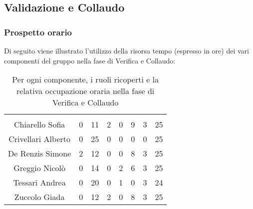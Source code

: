 \subsection{Validazione e Collaudo}

\subsubsection{Prospetto orario}
Di seguito viene illustrato l'utilizzo della risorsa tempo (espresso in ore) dei vari componenti del gruppo nella fase di Verifica e Collaudo:

\begin{table}[H]
	\begin{center}
		\begin{tabular}{c
				!{\color[HTML]{9b240a}\vrule width 1pt}
				cccccc
				!{\color[HTML]{9b240a}\vrule width 1pt}	
				c}
			\rowcolorhead
			 &  &  &  &  &  &  &  \\
			
			Chiarello Sofia & 0 & 11 & 2 & 0 & 9 & 3 & 25\\
			Crivellari Alberto & 0 & 25 & 0 & 0 & 0 & 0 & 25\\
			De Renzis Simone & 2 & 12 & 0 & 0 & 8 & 3 & 25\\
			Greggio Nicolò & 0 & 14 & 0 & 2 & 6 & 3 & 25\\
			Tessari Andrea & 0 & 20 & 0 & 1 & 0 & 3 & 24\\
			Zuccolo Giada & 0 & 12 & 2 & 0 & 8 & 3 & 25\\
		\end{tabular}
		\caption[Occupazione oraria Verifica e Collaudo]{Per ogni componente, i ruoli ricoperti e la relativa occupazione oraria nella fase di Verifica e Collaudo}
	\end{center}
\end{table}


